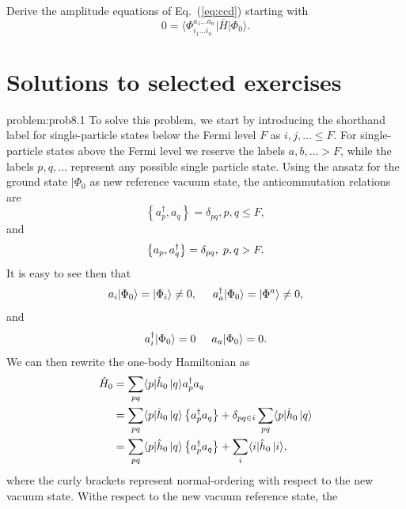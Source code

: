 \begin{prob} \label{prob:amplitudes}
Derive the amplitude equations of Eq.~(\ref{eq:ccd}) starting with 
 \[
          0 = \langle\Phi_{i_1 \ldots i_n}^{a_1 \ldots a_n}\vert
          \overline{H}\vert \Phi_0\rangle.
 \]

  \section{Solutions to selected exercises}
  \begin{sol}{problem:prob8.1}
  To solve this problem, we start by introducing the shorthand label
  for single-particle states below the Fermi level $F$ as $i,j,\ldots
  \leq F$. For single-particle states above the Fermi level we reserve
  the labels $a,b,\ldots > F$, while the labels $p,q, \ldots$
  represent any possible single particle state.  Using the ansatz for
  the ground state $\vert \Phi_0$ as new reference vacuum state, the
  anticommutation relations are
  \[
  \left\{a_p^\dagger, a_q \right\}= \delta_{pq}, p, q \leq F,
  \]
  and
  \[
  \left\{a_p, a_q^\dagger \right\} = \delta_{pq}, \hspace{0.1cm} p, q
  > F.
  \]
  It is easy to see then that
  \[
          a_i|\Phi_0\rangle = |\Phi_i\rangle\ne 0, \hspace{0.5cm}
          a_a^\dagger|\Phi_0\rangle = |\Phi^a\rangle\ne 0,
  \]
  and
  \[
  a_i^\dagger|\Phi_0\rangle = 0 \hspace{0.5cm} a_a|\Phi_0\rangle = 0.
  \]
  We can then rewrite the one-body Hamiltonian as
   \begin{align*}
          \hat{H}_0 &= \sum_{pq} \langle p|\hat{h}_0\,|{q}\rangle a^\dagger_p
          a_q \\ &= \sum_{pq} \langle p|\hat{h}_0\,|{q}\rangle
          \left\{a^\dagger_p a_q\right\} + \delta_{pq\in i} \sum_{pq}
          \langle p|\hat{h}_0\,|{q}\rangle \\ &= \sum_{pq}
          \langle p|\hat{h}_0\,|{q}\rangle \left\{a^\dagger_p a_q\right\} +
          \sum_i \langle i|\hat{h}_0\,|{i}\rangle,
   \end{align*}
  where the curly brackets represent normal-ordering with respect to
  the new vacuum state. Withe respect to the new vacuum reference
  state, the
  \end{sol}


\end{prob}
